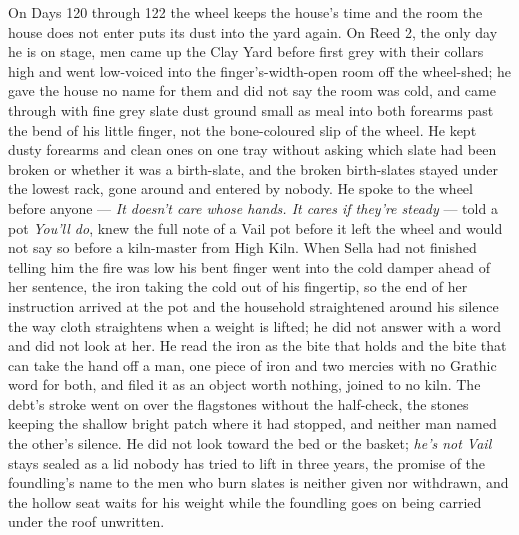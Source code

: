 \documentclass{design/chronicle}
\begin{document}
{On Days 120 through 122 the wheel keeps the house’s time and the room the house does not enter puts its dust into the yard again. On Reed 2, the only day he is on stage, men came up the Clay Yard before first grey with their collars high and went low-voiced into the finger’s-width-open room off the wheel-shed; he gave the house no name for them and did not say the room was cold, and came through with fine grey slate dust ground small as meal into both forearms past the bend of his little finger, not the bone-coloured slip of the wheel. He kept dusty forearms and clean ones on one tray without asking which slate had been broken or whether it was a birth-slate, and the broken birth-slates stayed under the lowest rack, gone around and entered by nobody. He spoke to the wheel before anyone — \emph{It doesn’t care whose hands. It cares if they’re steady} — told a pot \emph{You’ll do}, knew the full note of a Vail pot before it left the wheel and would not say so before a kiln-master from High Kiln. When Sella had not finished telling him the fire was low his bent finger went into the cold damper ahead of her sentence, the iron taking the cold out of his fingertip, so the end of her instruction arrived at the pot and the household straightened around his silence the way cloth straightens when a weight is lifted; he did not answer with a word and did not look at her. He read the iron as the bite that holds and the bite that can take the hand off a man, one piece of iron and two mercies with no Grathic word for both, and filed it as an object worth nothing, joined to no kiln. The debt’s stroke went on over the flagstones without the half-check, the stones keeping the shallow bright patch where it had stopped, and neither man named the other’s silence. He did not look toward the bed or the basket; \emph{he’s not Vail} stays sealed as a lid nobody has tried to lift in three years, the promise of the foundling’s name to the men who burn slates is neither given nor withdrawn, and the hollow seat waits for his weight while the foundling goes on being carried under the roof unwritten.

}
\end{document}

